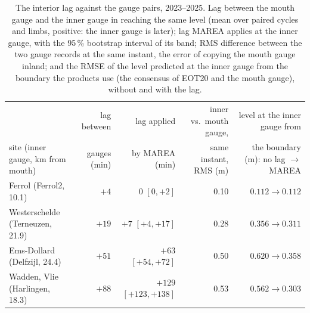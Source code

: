 \begin{table}[t]
\centering
\caption{The interior lag against the gauge pairs, 2023--2025. Lag between
the mouth gauge and the inner gauge in reaching the same level (mean over
paired cycles and limbs, positive: the inner gauge is later); lag MAREA
applies at the inner gauge, with the 95\,\% bootstrap interval of its
band; RMS difference between the two gauge records at the same instant,
the error of copying the mouth gauge inland; and the RMSE of the level
predicted at the inner gauge from the boundary the products use (the
consensus of EOT20 and the mouth gauge), without and with the lag.
}
\label{tab:lag_external}
\footnotesize
\setlength{\tabcolsep}{6pt}
\begin{tabular}{@{}lrrrr@{}}
\toprule
 & lag between & lag applied & inner vs.\ mouth gauge, & level at the inner gauge from \\
site (inner gauge, km from mouth) & gauges (min) & by MAREA (min) & same instant, RMS (m) & the boundary (m): no lag $\to$ MAREA \\
\midrule
Ferrol (Ferrol2, 10.1) & $+4$ & $0$ $[0, +2]$ & 0.10 & $0.112 \to 0.112$ \\
Westerschelde (Terneuzen, 21.9) & $+19$ & $+7$ $[+4, +17]$ & 0.28 & $0.356 \to 0.311$ \\
Ems-Dollard (Delfzijl, 24.4) & $+51$ & $+63$ $[+54, +72]$ & 0.50 & $0.620 \to 0.358$ \\
Wadden, Vlie (Harlingen, 18.3) & $+88$ & $+129$ $[+123, +138]$ & 0.53 & $0.562 \to 0.303$ \\
\bottomrule
\end{tabular}
\end{table}



